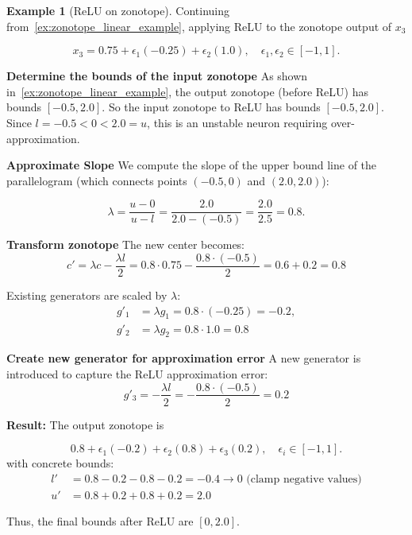 \documentclass[oneside,11pt,dvipsnames]{book}
\numberwithin{equation}{section}
\theoremstyle{definition}
\newtheorem{example}{Example}[section]
\theoremstyle{remark}
\begin{document}
\begin{example}[ReLU on zonotope]\label{ex:zonotope_relu_example}
Continuing from~\autoref{ex:zonotope_linear_example}, applying ReLU to the zonotope output of \(x_3\)

\[
x_3 = 0.75 + \epsilon_1(-0.25) + \epsilon_2(1.0), \quad \epsilon_1, \epsilon_2 \in [-1,1].
\]

\textbf{Determine the bounds of the input zonotope} As shown in~\autoref{ex:zonotope_linear_example}, the output zonotope (before ReLU) has bounds \([-0.5, 2.0]\).   So the input zonotope to ReLU has bounds \([-0.5, 2.0]\). Since \(l = -0.5 < 0 < 2.0 = u\), this is an unstable neuron requiring over-approximation.

\textbf{Approximate Slope}
We compute the slope of the upper bound line of the parallelogram (which connects points \((-0.5, 0)\) and \((2.0, 2.0)\)):

\[
\lambda = \frac{u-0}{u-l} = \frac{2.0}{2.0-(-0.5)} = \frac{2.0}{2.5} = 0.8.
\]

\textbf{Transform zonotope}
The new center becomes:
\[
c' = \lambda c - \frac{\lambda l }{2} = 0.8 \cdot 0.75 - \frac{0.8 \cdot (-0.5) }{2} = 0.6 + 0.2 = 0.8
\]

Existing generators are scaled by \(\lambda\):
\begin{align*}
g'_1 &= \lambda g_1 = 0.8 \cdot (-0.25) = -0.2, \\
g'_2 &= \lambda g_2 = 0.8 \cdot 1.0 = 0.8
\end{align*}

\textbf{Create new generator for approximation error}
A new generator is introduced to capture the ReLU approximation error:
\[
g'_3 = -\frac{\lambda l }{2} = -\frac{0.8 \cdot (-0.5) }{2} = 0.2
\]

\textbf{Result:} The output zonotope is

\[
0.8 + \epsilon_1(-0.2) + \epsilon_2(0.8) + \epsilon_3(0.2), \quad \epsilon_i \in [-1,1].
\]
with concrete bounds:
\begin{align*}
l' &= 0.8 - 0.2 - 0.8 - 0.2 = -0.4 \rightarrow 0 \text{ (clamp negative values)}\\
u' &= 0.8 + 0.2 + 0.8 + 0.2 = 2.0
\end{align*}

Thus, the final bounds after ReLU are \([0, 2.0]\).

\end{example}


\end{document}
